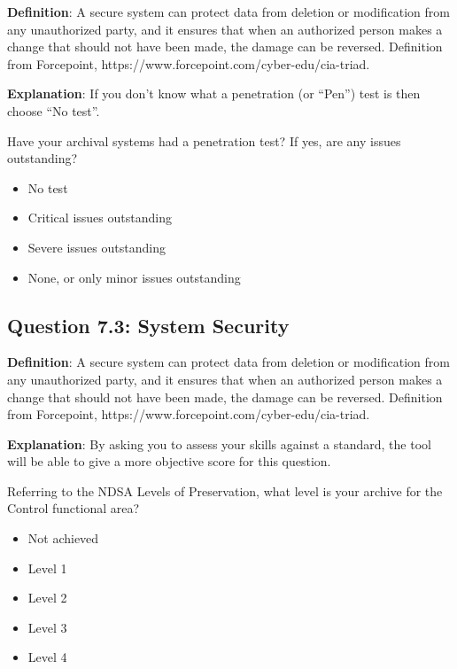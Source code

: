 \documentclass[a4paper,oneside]{article}
\providecommand{\tightlist}{%
    \setlength{\itemsep}{2pt}\setlength{\parskip}{0pt}}
\begin{document}
\begin{landscape}
\textbf{Definition}: A secure system can protect data from deletion or modification from any unauthorized party, and it ensures that when an authorized person makes a change that should not have been made, the damage can be reversed. Definition from Forcepoint, https://www.forcepoint.com/cyber-edu/cia-triad.

\textbf{Explanation}: If you don't know what a penetration (or ``Pen'') test is then choose ``No test''.

Have your archival systems had a penetration test? If yes, are any issues outstanding?

\begin{itemize}
\tightlist
\item
  No test\\
\item
  Critical issues outstanding\\
\item
  Severe issues outstanding\\
\item
  None, or only minor issues outstanding
\end{itemize}

\newpage

\hypertarget{question-7.3-system-security}{%
\subsection{Question 7.3: System Security}\label{question-7.3-system-security}}

\textbf{Definition}: A secure system can protect data from deletion or modification from any unauthorized party, and it ensures that when an authorized person makes a change that should not have been made, the damage can be reversed. Definition from Forcepoint, https://www.forcepoint.com/cyber-edu/cia-triad.

\textbf{Explanation}: By asking you to assess your skills against a standard, the tool will be able to give a more objective score for this question.

Referring to the NDSA Levels of Preservation, what level is your archive for the Control functional area?

\begin{itemize}
\tightlist
\item
  Not achieved\\
\item
  Level 1\\
\item
  Level 2\\
\item
  Level 3\\
\item
  Level 4
\end{itemize}


\end{landscape}
\end{document}
